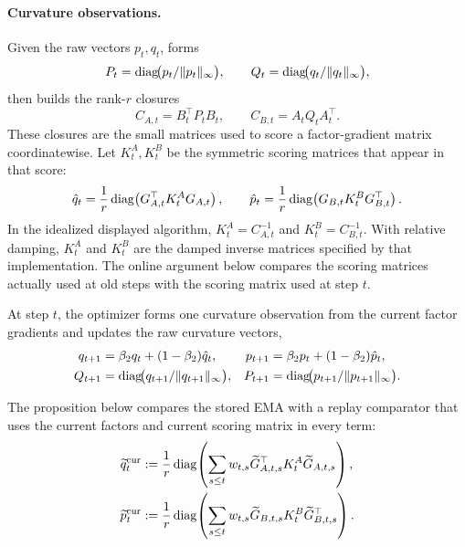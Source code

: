 \paragraph{Curvature observations.}
Given the raw vectors $p_t,q_t$,  forms
\[
  P_t=\operatorname{diag}\!\bigl(p_t/\| p_t\|_\infty\bigr),
  \qquad
  Q_t=\operatorname{diag}\!\bigl(q_t/\| q_t\|_\infty\bigr),
\]
then builds the rank-$r$ closures
\[
  C_{A,t}=B_t^\top P_tB_t,
  \qquad
  C_{B,t}=A_tQ_tA_t^\top .
\]
These closures are the small matrices used to score a factor-gradient matrix
coordinatewise. Let $K^A_t,K^B_t$ be the symmetric scoring matrices that appear
in that score:
\[
  \hat q_t
  =
  \frac1r\operatorname{diag}\!\left(G_{A,t}^\top K^A_tG_{A,t}\right),
  \qquad
  \hat p_t
  =
  \frac1r\operatorname{diag}\!\left(G_{B,t}K^B_tG_{B,t}^\top\right).
\]
In the idealized displayed algorithm, $K^A_t=C_{A,t}^{-1}$ and
$K^B_t=C_{B,t}^{-1}$. With relative damping, $K^A_t$ and $K^B_t$ are the
damped inverse matrices specified by that implementation. The online argument
below compares the scoring matrices actually used at old steps with the scoring
matrix used at step $t$.

At step $t$, the optimizer forms one curvature observation from the current
factor gradients and updates the raw curvature vectors,
\begin{equation}\label{eq:ours-klcoupling-04}
\begin{aligned}
  q_{t+1}
  &=
  \beta_2q_t+(1-\beta_2)\hat q_t,
  &
  p_{t+1}
  &=
  \beta_2p_t+(1-\beta_2)\hat p_t,
  \\
  Q_{t+1}
  &=
  \operatorname{diag}\!\bigl(q_{t+1}/\| q_{t+1}\|_\infty\bigr),
  &
  P_{t+1}
  &=
  \operatorname{diag}\!\bigl(p_{t+1}/\| p_{t+1}\|_\infty\bigr).
\end{aligned}
\end{equation}

The proposition below compares the stored EMA with a replay comparator that
uses the current factors and current scoring matrix in every term:
\[
\begin{aligned}
  \widetilde q^{\mathrm{cur}}_t
  &:=
  \frac1r\operatorname{diag}\!\left(
    \sum_{s\le t}w_{t,s}
    \widetilde G_{A,t,s}^\top K^A_t\widetilde G_{A,t,s}
  \right),
  \\
  \widetilde p^{\mathrm{cur}}_t
  &:=
  \frac1r\operatorname{diag}\!\left(
    \sum_{s\le t}w_{t,s}
    \widetilde G_{B,t,s}K^B_t\widetilde G_{B,t,s}^\top
  \right).
\end{aligned}
\]

